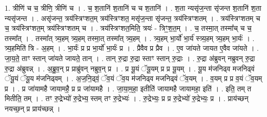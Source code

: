 \documentclass[17pt]{extarticle}
\begin{document}
1. त्रीणि॑ च च॒ त्रीणि॒ त्रीणि॑ च । . च॒ श॒तानि॑ श॒तानि॑ च च श॒तानि॑ । . श॒ता न्यसृ॑ज॒न्ता सृ॑जन्त श॒तानि॑ श॒ता न्यसृ॑जन्त । . असृ॑जन्त॒ त्रय॑स्त्रिꣳशत॒म् त्रय॑स्त्रिꣳशत॒ मसृ॑ज॒न्ता सृ॑जन्त॒ त्रय॑स्त्रिꣳशतम् । . त्रय॑स्त्रिꣳशतम् च च॒ त्रय॑स्त्रिꣳशत॒म् त्रय॑स्त्रिꣳशतम् च । . त्रय॑स्त्रिꣳशत॒मिति॒ त्रयः॑ - त्रिꣳ॒॒श॒त॒म् । . च॒ तस्मा॒त् तस्मा᳚च् च च॒ तस्मा᳚त् । . तस्मा᳚त् त्र्य॒हम् त्र्य॒हम् तस्मा॒त् तस्मा᳚त् त्र्य॒हम् । . त्र्य॒हम् भा॒र्यो॑ भा॒र्य॑ स्त्र्य॒हम् त्र्य॒हम् भा॒र्यः॑ । . त्र्य॒हमिति॑ त्रि - अ॒हम् । . भा॒र्यः॑ प्र प्र भा॒र्यो॑ भा॒र्यः॑ प्र । . प्रैवैव प्र प्रैव । . ए॒व जा॑यते जायत ए॒वैव जा॑यते । . जा॒य॒ते॒ ताꣳ स्तान् जा॑यते जायते॒ तान् । . तान् रु॒द्रा रु॒द्रा स्ताꣳ स्तान् रु॒द्राः । . रु॒द्रा अ॑ब्रुवन् नब्रुवन् रु॒द्रा रु॒द्रा अ॑ब्रुवन्न् । . अ॒ब्रु॒व॒न् प्र प्राब्रु॑वन् नब्रुव॒न् प्र । . प्र यू॒यं ॅयू॒यम् प्र प्र यू॒यम् । . यू॒य म॑जनिढ्व मजनिढ्वं ॅयू॒यं ॅयू॒य म॑जनिढ्वम् । . अ॒ज॒नि॒ढ्वं॒ ॅव॒यं ॅव॒य म॑जनिढ्व मजनिढ्वं ॅव॒यम् । . व॒यम् प्र प्र व॒यं ॅव॒यम् प्र । . प्र जा॑यामहै जायामहै॒ प्र प्र जा॑यामहै । . जा॒या॒म॒हा॒ इतीति॑ जायामहै जायामहा॒ इति॑ । . इति॒ तम् त मितीति॒ तम् । . तꣳ रु॒द्रेभ्यो॑ रु॒द्रेभ्य॒ स्तम् तꣳ रु॒द्रेभ्यः॑ । . रु॒द्रेभ्यः॒ प्र प्र रु॒द्रेभ्यो॑ रु॒द्रेभ्यः॒ प्र । . प्राय॑च्छन् नयच्छ॒न् प्र प्राय॑च्छन्न् । \newline
\end{document}
